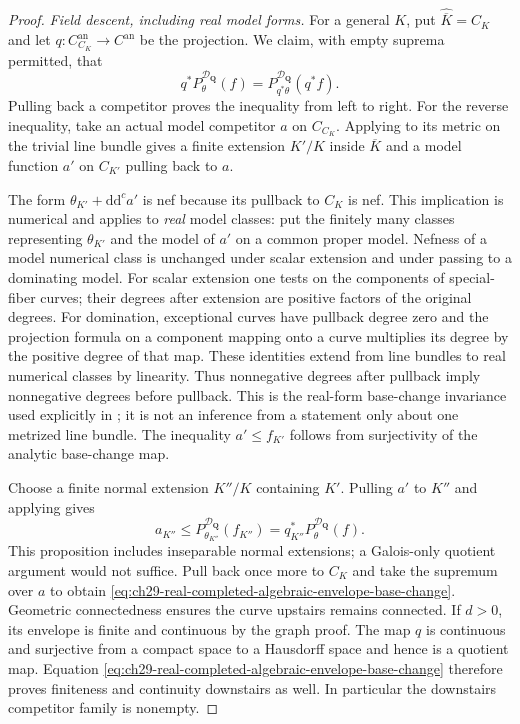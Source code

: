 \begin{proof}
\emph{Field descent, including real model forms.}
For a general $K$, put $\widehat{\overline K}=C_K$ and let
$q:C_{C_K}^{\mathrm{an}}\to C^{\mathrm{an}}$ be the projection.
We claim, with empty suprema permitted, that
\begin{equation}
\label{eq:ch29-real-completed-algebraic-envelope-base-change}
 q^*P^{\mathcal D_{\mathbf Q}}_\theta(f)
  =P^{\mathcal D_{\mathbf Q}}_{q^*\theta}(q^*f).
\end{equation}
Pulling back a competitor proves the inequality from left to right.
For the reverse inequality, take an actual model competitor $a$ on
$C_{C_K}$.  Applying \cite[Proposition~2.18(b)]{GM19} to its metric on
the trivial line bundle gives a finite extension $K'/K$ inside
$\overline K$ and a model function $a'$ on $C_{K'}$ pulling back to
$a$.

The form $\theta_{K'}+\mathrm d\mathrm d^ca'$ is nef because its
pullback to $C_K$ is nef.  This implication is numerical and applies to
\emph{real} model classes: put the finitely many classes representing
$\theta_{K'}$ and the model of $a'$ on a common proper model.
Nefness of a model numerical class is unchanged under scalar extension
and under passing to a dominating model.  For scalar extension one tests
on the components of special-fiber curves; their degrees after extension
are positive factors of the original degrees.  For domination,
exceptional curves have pullback degree zero and the projection formula
on a component mapping onto a curve multiplies its degree by the
positive degree of that map.  These identities extend from line bundles
to real numerical classes by linearity.  Thus nonnegative degrees after
pullback imply nonnegative degrees before pullback.  This is the real-form
base-change invariance used explicitly in
\cite[proof of Proposition~3.7]{GJKM19}; it is not an inference from a
statement only about one metrized line bundle.  The inequality
$a'\leq f_{K'}$ follows from surjectivity of the analytic base-change
map.

Choose a finite normal extension $K''/K$ containing $K'$.  Pulling $a'$
to $K''$ and applying \cite[Proposition~2.11]{GJKM19} gives
\[
 a_{K''}\leq P^{\mathcal D_{\mathbf Q}}_{\theta_{K''}}(f_{K''})
           =q_{K''}^*P^{\mathcal D_{\mathbf Q}}_\theta(f).
\]
This proposition includes inseparable normal extensions; a Galois-only
quotient argument would not suffice.  Pull back once more to $C_K$ and
take the supremum over $a$ to obtain
\eqref{eq:ch29-real-completed-algebraic-envelope-base-change}.
Geometric connectedness ensures the curve upstairs remains connected.
If $d>0$, its envelope is finite and continuous by the graph proof.
The map $q$ is continuous and surjective from a compact space to a
Hausdorff space and hence is a quotient map.  Equation
\eqref{eq:ch29-real-completed-algebraic-envelope-base-change} therefore
proves finiteness and continuity downstairs as well.  In particular the
downstairs competitor family is nonempty.


\end{proof}
